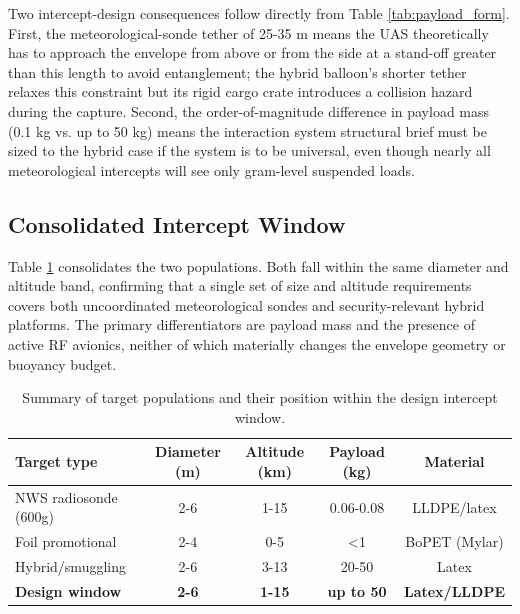 \vspace{-10pt}
Two intercept-design consequences follow directly from
Table \ref{tab:payload_form}. First, the meteorological-sonde tether of 25-35 m means the UAS theoretically has to approach the envelope from above or from the side at a stand-off greater than this length to avoid entanglement; the hybrid balloon's shorter tether relaxes this constraint but its rigid cargo crate introduces a collision hazard during the capture. Second, the order-of-magnitude difference in payload mass (0.1 kg vs. up to 50 kg) means the interaction system structural brief must be sized to the hybrid case if the system is to be universal, even though nearly all meteorological intercepts will see only gram-level suspended loads.

\vspace{-10pt}
\subsection{Consolidated Intercept Window}
\label{subsec:intercept_window}
Table \ref{tab:intercept_summary} consolidates the two populations. Both fall within the same diameter and altitude band, confirming that a single set of size and altitude requirements covers both uncoordinated meteorological sondes and security-relevant hybrid platforms. The primary differentiators are payload mass and the presence of active RF avionics, neither of which materially changes the envelope geometry or buoyancy budget.
\begin{table}[H]
\centering
\caption{Summary of target populations and their position within the design intercept window.}
\label{tab:intercept_summary}
\begin{tabular}{@{}lcccc@{}}
\toprule
\textbf{Target type} & \textbf{Diameter (m)} & \textbf{Altitude (km)} & \textbf{Payload (kg)} & \textbf{Material} \\
\midrule
NWS radiosonde (600g)       & 2-6  & 1-15 & 0.06-0.08 & LLDPE/latex \\
Foil promotional      & 2-4  & 0-5  & <1         & BoPET (Mylar) \\
Hybrid/smuggling & 2-6  & 3-13 & 20-50     & Latex \\
\midrule
\textbf{Design window}      & \textbf{2-6} & \textbf{1-15} & \textbf{up to 50} & \textbf{Latex/LLDPE} \\
\bottomrule
\end{tabular}
\end{table}

